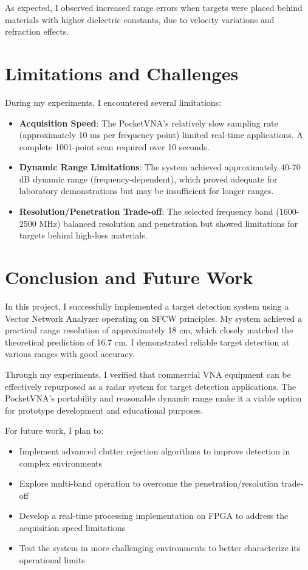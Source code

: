 \documentclass[11pt,a4paper]{article}
\begin{document}
As expected, I observed increased range errors when targets were placed behind materials with higher dielectric constants, due to velocity variations and refraction effects.

\section{Limitations and Challenges}

During my experiments, I encountered several limitations:

\begin{itemize}
    \item \textbf{Acquisition Speed}: The PocketVNA's relatively slow sampling rate (approximately 10 ms per frequency point) limited real-time applications. A complete 1001-point scan required over 10 seconds.
    
    \item \textbf{Dynamic Range Limitations}: The system achieved approximately 40-70 dB dynamic range (frequency-dependent), which proved adequate for laboratory demonstrations but may be insufficient for longer ranges.
    
    \item \textbf{Resolution/Penetration Trade-off}: The selected frequency band (1600-2500 MHz) balanced resolution and penetration but showed limitations for targets behind high-loss materials.
\end{itemize}

\section{Conclusion and Future Work}

In this project, I successfully implemented a target detection system using a Vector Network Analyzer operating on SFCW principles. My system achieved a practical range resolution of approximately 18 cm, which closely matched the theoretical prediction of 16.7 cm. I demonstrated reliable target detection at various ranges with good accuracy.

Through my experiments, I verified that commercial VNA equipment can be effectively repurposed as a radar system for target detection applications. The PocketVNA's portability and reasonable dynamic range make it a viable option for prototype development and educational purposes.

For future work, I plan to:

\begin{itemize}
    \item Implement advanced clutter rejection algorithms to improve detection in complex environments
    \item Explore multi-band operation to overcome the penetration/resolution trade-off
    \item Develop a real-time processing implementation on FPGA to address the acquisition speed limitations
    \item Test the system in more challenging environments to better characterize its operational limits
\end{itemize}
\end{document}
